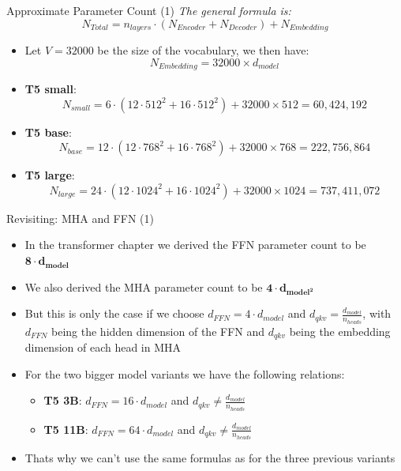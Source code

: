 \documentclass[11pt,compress,t,notes=noshow, xcolor=table]{beamer}
\begin{document}
\begin{frame}{Approximate Parameter Count (1)}
\textit{The general formula is:} $$N_{Total} = n_{layers}\cdot (N_{Encoder} + N_{Decoder}) + N_{Embedding}$$

\begin{itemize}
    \item Let $V = 32000$ be the size of the vocabulary, we then have: $$N_{Embedding} = 32000 \times d_{model}$$

    \item \textbf{T5 small}:
        $$N_{small} = 6\cdot (12\cdot 512^2 + 16\cdot 512^2) + 32000\times 512 = 60,424,192$$
    \item \textbf{T5 base}:
        $$N_{base} = 12\cdot (12\cdot 768^2 + 16\cdot 768^2) + 32000\times 768 = 222,756,864$$
    \item \textbf{T5 large}:
        $$N_{large} = 24\cdot (12\cdot 1024^2 + 16\cdot 1024^2) + 32000\times 1024 = 737,411,072$$
    
\end{itemize}
    
\end{frame}


\begin{frame}{Revisiting: MHA and FFN (1)}

\begin{itemize}
    \item In the transformer chapter we derived the FFN parameter count to be $\bm{8\cdot d_{model}}$
    \item We also derived the MHA parameter count to be $\bm{4\cdot d_{model^2}}$ 
    \item But this is only the case if we choose $d_{FFN} = 4\cdot d_{model}$ and $d_{qkv} = \frac{d_{model}}{n_{heads}}$, with $d_{FFN}$ being the hidden dimension of the FFN and $d_{qkv}$ being the embedding dimension of each head in MHA 
    \item For the two bigger model variants we have the following relations:
    \begin{itemize}
        \item \textbf{T5 3B}: $d_{FFN} = 16\cdot d_{model}$ and $d_{qkv} \neq \frac{d_{model}}{n_{heads}}$
        \item \textbf{T5 11B}: $d_{FFN} = 64\cdot d_{model}$ and $d_{qkv} \neq \frac{d_{model}}{n_{heads}}$ 
    \end{itemize}
    \item Thats why we can't use the same formulas as for the three previous variants
\end{itemize}
    
\end{frame}
\end{document}
